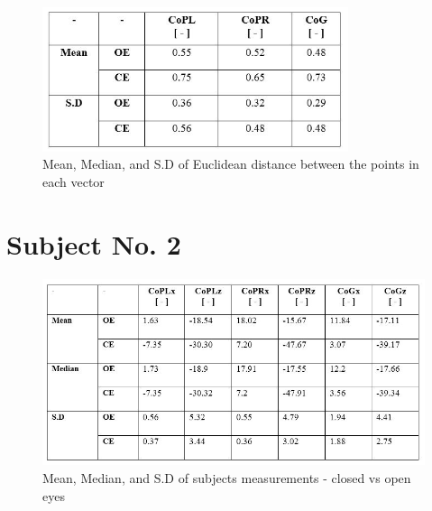 \documentclass[twoside]{ctuthesis}
\theoremstyle{plain}
\theoremstyle{definition}
\theoremstyle{note}
\begin{document}
\begin{figure}[H]
	\centering
	\includegraphics[width = 0.8\textwidth]{Patient1DistTable}
	\begin{table}[H]
		\caption{Mean, Median, and S.D of Euclidean distance between the points in each vector}
	\end{table}
\end{figure}


\section{Subject No. 2}

\begin{figure}[H]
	\centering
	\includegraphics[width = \textwidth]{Patient2DataTable}
	\begin{table}[H]
		\caption{Mean, Median, and S.D of subjects measurements - closed vs open eyes}
	\end{table}
\end{figure}
\end{document}
